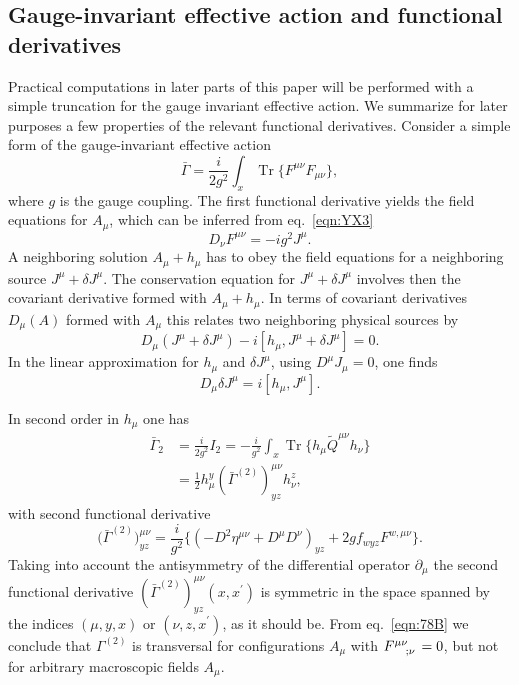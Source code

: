 \documentclass[twocolumn,aps,prd,amsmath,amssymb,preprintnumbers,longbibliography]{revtex4-1}
\numberwithin{equation}{section}
\DeclareMathOperator{\Tr}{Tr}
\newenvironment{alignedeqn}{\begin{equation}\begin{aligned}}{\end{aligned}\end{equation}\ignorespacesafterend}
\begin{document}
\subsection{Gauge-invariant effective action and functional derivatives}

Practical computations in later parts of this paper will be performed with a simple truncation for the gauge invariant effective action. We summarize for later purposes a few properties of the relevant functional derivatives. Consider a simple form of the gauge-invariant effective action
\begin{equation}\label{eqn:YX10}
	\bar\Gamma
	= \frac{i}{2g^2} \int_x \Tr\{F^{\mu\nu} F_{\mu\nu}\},
\end{equation}
where $g$ is the gauge coupling. The first functional derivative yields the field equations for $A_\mu$, which can be inferred from eq.~\eqref{eqn:YX3}
\begin{equation}\label{eqn:YX11}
	D_\nu F^{\mu\nu}
	= -i g^2 J^\mu.
\end{equation}
A neighboring solution $A_\mu + h_\mu$ has to obey the field equations for a neighboring source $J^\mu + \delta J^\mu$. The conservation equation for $J^\mu + \delta J^\mu$ involves then the covariant derivative formed with $A_\mu + h_\mu$. In terms of covariant derivatives $D_\mu(A)$ formed with $A_\mu$ this relates two neighboring physical sources by
\begin{equation}\label{eqn:YX12}
	D_\mu(J^\mu + \delta J^\mu) - i[h_\mu,J^\mu + \delta J^\mu]
	= 0.
\end{equation}
In the linear approximation for $h_\mu$ and $\delta J^\mu$, using $D^\mu J_\mu = 0$, one finds
\begin{equation}\label{eqn:YX13}
	D_\mu \delta J^\mu
	= i [h_\mu,J^\mu].
\end{equation}

In second order in $h_\mu$ one has
\begin{alignedeqn}\label{eqn:A21-1}
	\bar\Gamma_2
	&= \frac{i}{2g^2} I_2
	= -\frac{i}{g^2} \int_x \Tr\{h_\mu \tilde{Q}^{\mu\nu}h_\nu\}\\
	&= \frac{1}{2} h^y_\mu \left(\bar \Gamma^{(2)}\right)^{\mu\nu}_{yz} h^z_\nu,
\end{alignedeqn}
with second functional derivative
\begin{equation}\label{eqn:A21-2}
	\bigl(\bar\Gamma^{(2)}\bigr)^{\mu\nu}_{yz}
	= \frac{i}{g^2}\bigl\{(-D^2 \eta^{\mu\nu} + D^\mu D^\nu)_{yz} + 2 g f_{wyz} F^{w,\mu\nu}\bigr\}.
\end{equation}
Taking into account the antisymmetry of the differential operator $\partial_\mu$ the second functional derivative $(\bar{\Gamma}^{(2)})^{\mu\nu}_{yz}(x,x^\prime)$ is symmetric in the space spanned by the indices $(\mu,y,x)$ or $(\nu,z,x^\prime)$, as it should be. From eq.~\eqref{eqn:78B} we conclude that $\Gamma^{(2)}$ is transversal for configurations $A_\mu$ with $\tensor{F}{^\mu^\nu_;_\nu}=0$, but not for arbitrary macroscopic fields $A_\mu$.
\end{document}
